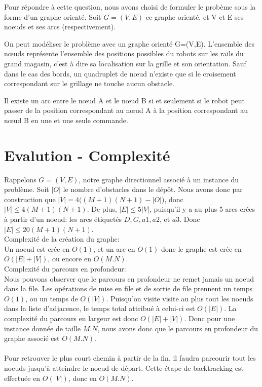 \documentclass[12pt]{article}
\begin{document}
Pour répondre à cette question, nous avons choisi de formuler le probème sous la forme d'un graphe orienté. Soit $G=(V,E)$ ce graphe orienté, et V et E ses noeuds et ses arcs (respectivement). 

On peut modéliser le problème avec un graphe orienté G=(V,E). 
L'ensemble des nœuds représente l'ensemble des positions possibles du robots sur les rails du grand magasin, c'est à dire sa localisation sur la grille et son orientation. Sauf dans le cas des bords, un quadruplet de nœud n'existe que si le croisement correspondant sur le grillage ne touche aucun obstacle.

Il existe un arc entre le nœud A et le nœud B si et seulement si le robot peut passer de la position correspondant au nœud A à la position correspondant au nœud B en une et une seule commande.

\clearpage
\newpage
\section{Evalution - Complexité}




Rappelons $G= (V, E)$, notre graphe directionnel associé à un instance du problème. Soit $|O|$ le nombre d'obstacles dans le dépôt. Nous avons donc par construction que $|V| = 4\big((M+1)(N+1)-|O|)$, donc $|V| \le 4(M+1)(N+1)$. De plus, $|E| \le 5|V|$, puisqu'il y a au plus 5 arcs crées à partir d'un noeud: les arcs étiquetés $D, G, a1, a2$, et $a3$. Donc $|E| \le 20(M+1)(N+1).$\\

Complexité de la création du graphe:\\
Un noeud est crée en $O(1)$, et un arc en $O(1)$ donc le graphe est crée en  $O(|E|+|V|)$, ou encore en $O(M.N)$.\\

Complexité du parcours en profondeur:\\
Nous pouvons observer que le parcours en profondeur ne remet jamais un noeud dans la file. Les opérations de mise en file et de sortie de file prennent un temps $O(1)$, ou un temps de $O(|V|)$. Puisqu'on visite visite au plus tout les noeuds dans la liste d'adjacence, le temps total attribué à celui-ci est $O(|E|)$. La complexité du parcours en largeur est donc $O(|E|+|V|)$. Donc pour une instance donnée de taille $M.N$, nous avons donc que le parcours en profondeur du graphe associé est $O(M.N)$.
\\\\
Pour retrouver le plus court chemin à partir de la fin, il faudra parcourir tout les noeuds jusqu'à atteindre le noeud de départ. Cette étape de backtracking est effectuée en $O(|V|)$, donc en $O(M.N)$.\\\\
\end{document}
